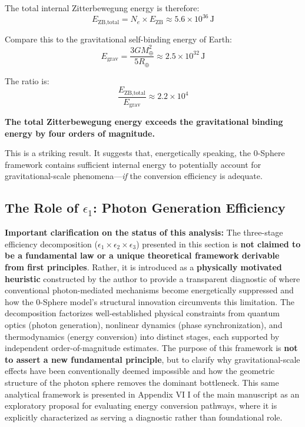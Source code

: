 \documentclass[12pt,letterpaper]{article}
\begin{document}
The total internal Zitterbewegung energy is therefore:
\begin{equation}
E_\text{ZB,total} = N_e \times E_\text{ZB} \approx 5.6 \times 10^{36} \, \text{J}
\end{equation}

Compare this to the gravitational self-binding energy of Earth:
\begin{equation}
E_\text{grav} = \frac{3GM_\oplus^2}{5R_\oplus} \approx 2.5 \times 10^{32} \, \text{J}
\end{equation}

The ratio is:
\begin{equation}
\frac{E_\text{ZB,total}}{E_\text{grav}} \approx 2.2 \times 10^4
\end{equation}

\textbf{The total Zitterbewegung energy exceeds the gravitational binding energy by four orders of magnitude.}

This is a striking result. It suggests that, energetically speaking, the 0-Sphere framework contains sufficient internal energy to potentially account for gravitational-scale phenomena---\textit{if} the conversion efficiency is adequate.


\subsection{The Role of $\epsilon_1$: Photon Generation Efficiency}
\label{subsec:epsilon1}

\textbf{Important clarification on the status of this analysis:} The three-stage efficiency decomposition ($\epsilon_1 \times \epsilon_2 \times \epsilon_3$) presented in this section is \textbf{not claimed to be a fundamental law or a unique theoretical framework derivable from first principles}. Rather, it is introduced as a \textbf{physically motivated heuristic} constructed by the author to provide a transparent diagnostic of where conventional photon-mediated mechanisms become energetically suppressed and how the 0-Sphere model's structural innovation circumvents this limitation. The decomposition factorizes well-established physical constraints from quantum optics (photon generation), nonlinear dynamics (phase synchronization), and thermodynamics (energy conversion) into distinct stages, each supported by independent order-of-magnitude estimates. The purpose of this framework is \textbf{not to assert a new fundamental principle}, but to clarify why gravitational-scale effects have been conventionally deemed impossible and how the geometric structure of the photon sphere removes the dominant bottleneck. This same analytical framework is presented in Appendix VI I of the main manuscript \cite{Hanamura2026geometrical} as an exploratory proposal for evaluating energy conversion pathways, where it is explicitly characterized as serving a diagnostic rather than foundational role.
\end{document}
